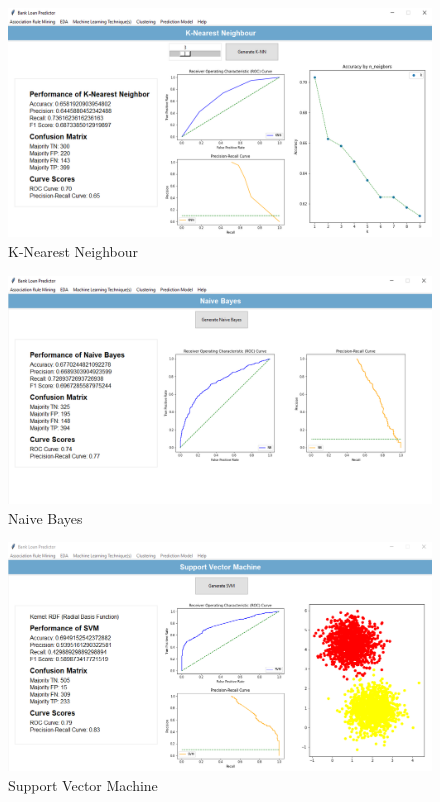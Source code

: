\documentclass[11pt]{article}
\begin{document}
\begin{figure}[h]
\centerline{\includegraphics[scale=0.35]{deploy_knn.PNG}}
\label{fig:deployKNN}
\caption{K-Nearest Neighbour}
\end{figure}

\begin{figure}[h]
\centerline{\includegraphics[scale=0.35]{deploy_nb.PNG}}
\label{fig:deployNB}
\caption{Naive Bayes}
\end{figure}

\begin{figure}[h]
\centerline{\includegraphics[scale=0.35]{deploy_svm.PNG}}
\label{fig:deploysvm}
\caption{Support Vector Machine}
\end{figure}
\end{document}
